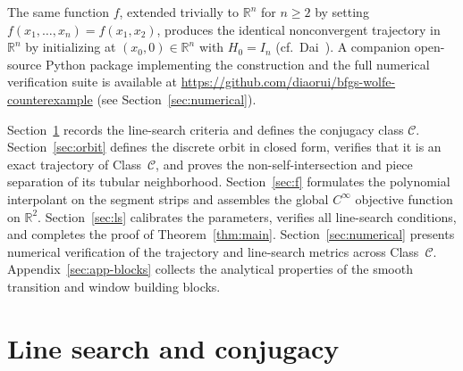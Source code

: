 \documentclass[11pt]{article}
\newcommand{\R}{\mathbb{R}}
\begin{document}
The same function $f$, extended trivially to $\R^n$ for $n \ge 2$ by setting $f(x_1, \dots, x_n) = f(x_1, x_2)$, produces the identical nonconvergent trajectory in $\R^n$ by initializing at $(x_0, 0) \in \R^n$ with $H_0 = I_n$ (cf.~Dai~\cite{dai2013}).
A companion open-source Python package implementing the construction and the full numerical verification suite is available at \url{https://github.com/diaorui/bfgs-wolfe-counterexample} (see Section~\ref{sec:numerical}).

Section~\ref{sec:class} records the line-search criteria and defines the conjugacy class $\mathcal C$.
Section~\ref{sec:orbit} defines the discrete orbit in closed form, verifies that it is an exact trajectory of Class~$\mathcal C$, and proves the non-self-intersection and piece separation of its tubular neighborhood.
Section~\ref{sec:f} formulates the polynomial interpolant on the segment strips and assembles the global $C^\infty$ objective function on $\R^2$.
Section~\ref{sec:ls} calibrates the parameters, verifies all line-search conditions, and completes the proof of Theorem~\ref{thm:main}.
Section~\ref{sec:numerical} presents numerical verification of the trajectory and line-search metrics across Class~$\mathcal C$.
Appendix~\ref{sec:app-blocks} collects the analytical properties of the smooth transition and window building blocks.

\section{Line search and conjugacy}
\label{sec:class}
\end{document}
